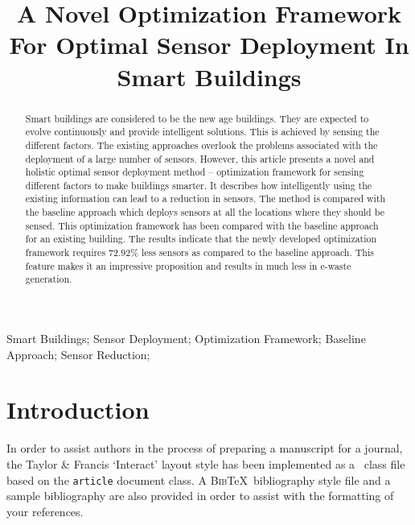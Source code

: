 \documentclass[]{interact}
\theoremstyle{plain}%
\theoremstyle{definition}
\theoremstyle{remark}
\begin{document}

\title{A Novel Optimization Framework For Optimal Sensor Deployment In Smart Buildings }

\author{
}

\maketitle

\begin{abstract}
  Smart buildings are considered to be the new age buildings. They are expected to evolve continuously and provide intelligent solutions. This is achieved by sensing the different factors. The existing approaches overlook the problems associated with the deployment of a large number of sensors. However, this article presents a novel and holistic optimal sensor deployment method -- optimization framework for sensing different factors to make buildings smarter. It describes how intelligently using the existing information can lead to a reduction in sensors. The method is compared with the baseline approach which deploys sensors at all the locations where they should be sensed. This optimization framework has been compared with the baseline approach for an existing building. The results indicate that the newly developed optimization framework requires 72.92\% less sensors as compared to the baseline approach. This feature makes it an impressive proposition and results in much less in e-waste generation. 
\end{abstract}

\begin{keywords}
Smart Buildings; Sensor Deployment; Optimization Framework; Baseline Approach; Sensor Reduction;
\end{keywords}

\section{Introduction}

In order to assist authors in the process of preparing a manuscript for a journal, the Taylor \& Francis `\textsf{Interact}' layout style has been implemented as a \LaTeXe\ class file based on the \texttt{article} document class. A \textsc{Bib}\TeX\ bibliography style file and a sample bibliography are also provided in order to assist with the formatting of your references.
\end{document}
